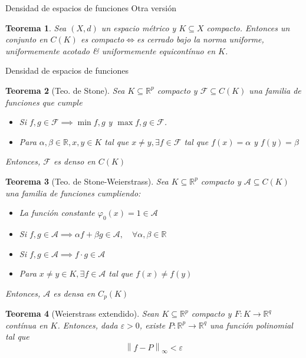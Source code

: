 \documentclass[a4paper]{article}\usepackage{/home/alonso/Documents/Projects/formularios/styles}
\theoremstyle{mytheoremstyle}
\newtheorem{theorem}{Teorema}
\newcommand{\R}{\mathbb{R}}
\newcommand{\1}{\mathds{1}}
\newcommand{\norm}[1]{\left\|#1\right\|}
\begin{document}
\begin{multicols*}{3}
\begin{roundbox}{Densidad de espacios de funciones}
Otra versión

\begin{theorem}
    Sea $(X,d)$ un espacio métrico y $K \subseteq X$ compacto.
    Entonces un conjunto en $C(K)$ es compacto$\iff$es cerrado bajo la norma uniforme, uniformemente acotado \& uniformemente equicontínuo en $K$.
\end{theorem}
\end{roundbox}

\begin{roundbox}{Densidad de espacios de funciones}
\begin{theorem}[Teo. de Stone]
    Sea $K \subseteq \R^{p}$ compacto y $\mathcal{F} \subseteq C(K)$ una familia de funciones que cumple
    \begin{itemize}
        \item Si $f,g \in \mathcal{F} \implies \min{f,g}$ y $\max{f,g} \in \mathcal{F}$.
        \item Para $\alpha, \beta \in \R, x,y \in K$ tal que $x\neq y, \exists f \in \mathcal{F}$ tal que $f(x) = \alpha$ y $f(y) = \beta$
    \end{itemize}
    Entonces, $\mathcal{F}$ es denso en $C(K)$
\end{theorem}

\begin{theorem}[Teo. de Stone-Weierstrass]
    Sea $K \subseteq \R^{p}$ compacto y $\mathcal{A} \subseteq C(K)$ una familia de funciones cumpliendo:
    \begin{itemize}
        \item La función constante $\varphi_{0}(x) = 1 \in \mathcal{A}$
        \item Si $f,g \in \mathcal{A} \implies \alpha f + \beta g \in \mathcal{A}, \quad \forall \alpha, \beta \in \R$
        \item Si $f,g \in \mathcal{A} \implies f \cdot g \in \mathcal{A}$
        \item Para $x\neq y \in K, \exists f \in \mathcal{A}$ tal que $f(x) \neq f(y)$
    \end{itemize}
    Entonces, $\mathcal{A}$ es densa en $C_{p}(K)$
\end{theorem}

\begin{theorem}[Weierstrass extendido]
    Sean $K \subseteq \R^{p}$ compacto y $F: K \to \R^{q}$ contínua en $K$.
    Entonces, dada $\varepsilon > 0$, existe $P:\R^{p} \to \R^{q}$ una función polinomial tal que
    \[
        \norm{f - P}_{\infty} < \varepsilon
    \]
\end{theorem}


\end{roundbox}
\end{multicols*}
\end{document}
